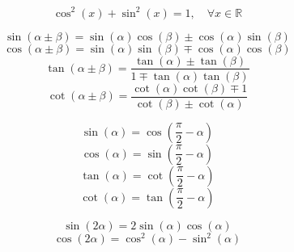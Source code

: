 \documentclass{book}
\begin{document}
\begin{theorem}
    \[ \cos^2(x) + \sin^2(x) = 1, \quad \forall x \in \mathbb{R}\]
\end{theorem}
\begin{theorem}
    \[\sin(\alpha \pm \beta) = \sin(\alpha)\cos(\beta) \pm \cos(\alpha)\sin(\beta)\]
    \[\cos(\alpha \pm \beta) = \sin(\alpha)\sin(\beta) \mp \cos(\alpha)\cos(\beta)\]
    \[\tan(\alpha \pm \beta) = \frac{\tan(\alpha) \pm \tan(\beta)}{1 \mp \tan(\alpha)\tan(\beta)}\]
    \[\cot(\alpha \pm \beta) = \frac{\cot(\alpha)\cot(\beta) \mp 1}{\cot(\beta) \pm \cot(\alpha)}\]
\end{theorem}
\begin{theorem}
    \[\sin(\alpha) = \cos\left(\frac{\pi}{2} - \alpha\right)\]
    \[\cos(\alpha) = \sin\left(\frac{\pi}{2} - \alpha\right)\]
    \[\tan(\alpha) = \cot\left(\frac{\pi}{2} - \alpha\right)\]
    \[\cot(\alpha) = \tan\left(\frac{\pi}{2} - \alpha\right)\]
\end{theorem}
\begin{theorem}
    \[\sin(2\alpha) = 2\sin(\alpha)\cos(\alpha)\]
    \[\cos(2\alpha) = \cos^2(\alpha) - \sin^2(\alpha)\]
\end{theorem}
\end{document}
